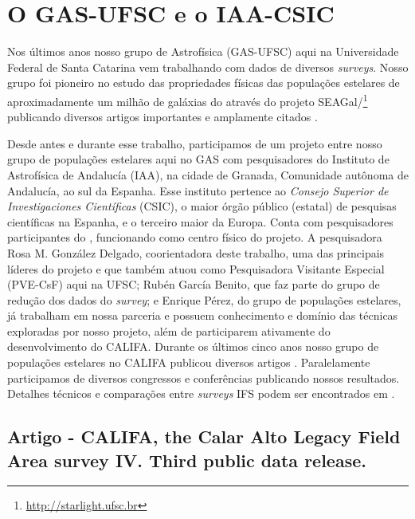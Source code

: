 \section{O GAS-UFSC e o IAA-CSIC}
\label{sec:intro:UFSCeIAA}

Nos últimos anos nosso grupo de Astrofísica (GAS-UFSC) aqui na Universidade Federal de Santa Catarina vem trabalhando com dados de diversos {\em surveys}. Nosso grupo foi pioneiro no estudo das propriedades físicas das populações estelares de aproximadamente um milhão de galáxias do \SDSS através do projeto SEAGal/\starlight\footnote{\href{http://starlight.ufsc.br}{http://starlight.ufsc.br}} publicando diversos artigos importantes e amplamente citados \citep[e.g., ][]{CidFernandes.etal.2005a, Mateus.etal.2006a, Stasinska.etal.2006a, Asari.etal.2007a, Stasinska.etal.2008a, CidFernandes.etal.2011a}.

Desde antes e durante esse trabalho, participamos de um projeto entre nosso grupo de populações estelares aqui no GAS com pesquisadores do Instituto de Astrofísica de Andalucía (IAA), na cidade de Granada, Comunidade autônoma de Andalucía, ao sul da Espanha. Esse instituto pertence ao {\em Consejo Superior de Investigaciones Científicas} (CSIC), o maior órgão público (estatal) de pesquisas científicas na Espanha, e o terceiro maior da Europa. Conta com pesquisadores participantes do \CALS, funcionando como centro físico do projeto. A pesquisadora Rosa M. González Delgado, coorientadora deste trabalho, uma das principais líderes do projeto e que também atuou como Pesquisadora Visitante Especial (PVE-CsF) aqui na UFSC; Rubén García Benito, que faz parte do grupo de redução dos dados do {\em survey}; e Enrique Pérez, do grupo de populações estelares, já trabalham em nossa parceria e possuem conhecimento e domínio das técnicas exploradas por nosso projeto, além de participarem ativamente do desenvolvimento do CALIFA. Durante os últimos cinco anos nosso grupo de populações estelares no CALIFA publicou diversos artigos \citep[e.g.,][]{Perez.etal.2013a, GonzalezDelgado.etal.2014a, GonzalezDelgado.etal.2014b, GonzalezDelgado.etal.2015a, GonzalezDelgado.etal.2016a, deAmorim.etal.2017, GonzalezDelgado.etal.2017, RGB.etal.2017, Lacerda.etal.2017}. Paralelamente participamos de diversos congressos e conferências publicando nossos resultados. Detalhes técnicos e comparações entre {\em surveys} IFS podem ser encontrados em \citet{Andre2015}.


\subsection{Artigo - CALIFA, the Calar Alto Legacy Field Area survey IV. Third public data release.}
\label{sec:intro:UFSCeIAA:DR3}

